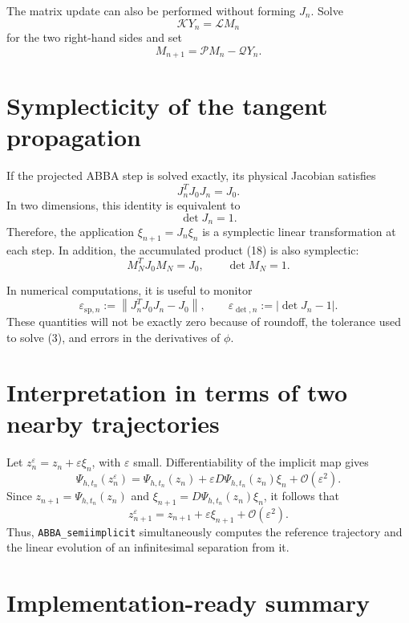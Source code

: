\documentclass[11pt,a4paper]{article}
\newcommand{\norm}[1]{\left\lVert #1\right\rVert}
\begin{document}
The matrix update can also be performed without forming $J_n$. Solve
\[
 \mathcal K Y_n=\mathcal L M_n
\]
for the two right-hand sides and set
\[
 \boxed{
 M_{n+1}=\mathcal P M_n-\mathcal QY_n.
 }
 \tag{19}
\]

\section{Symplecticity of the tangent propagation}

If the projected ABBA step is solved exactly, its physical Jacobian satisfies
\[
 J_n^TJ_0J_n=J_0.
\]
In two dimensions, this identity is equivalent to
\[
 \det J_n=1.
\]
Therefore, the application $\xi_{n+1}=J_n\xi_n$ is a symplectic linear transformation at
each step. In addition, the accumulated product (18) is also symplectic:
\[
 M_N^TJ_0M_N=J_0,
 \qquad
 \det M_N=1.
\]

In numerical computations, it is useful to monitor
\[
 \varepsilon_{\mathrm{sp},n}
 :=\norm{J_n^TJ_0J_n-J_0},
 \qquad
 \varepsilon_{\det,n}:=\lvert\det J_n-1\rvert.
\]
These quantities will not be exactly zero because of roundoff, the tolerance used to
solve (3), and errors in the derivatives of $\phi$.

\section{Interpretation in terms of two nearby trajectories}

Let $z_n^\varepsilon=z_n+\varepsilon\xi_n$, with $\varepsilon$ small. Differentiability of
the implicit map gives
\[
 \Psi_{h,t_n}(z_n^\varepsilon)
 =\Psi_{h,t_n}(z_n)
 +\varepsilon D\Psi_{h,t_n}(z_n)\xi_n
 +\mathcal O(\varepsilon^2).
\]
Since $z_{n+1}=\Psi_{h,t_n}(z_n)$ and
$\xi_{n+1}=D\Psi_{h,t_n}(z_n)\xi_n$, it follows that
\[
 z_{n+1}^\varepsilon
 =z_{n+1}+\varepsilon\xi_{n+1}+\mathcal O(\varepsilon^2).
\]
Thus, \texttt{ABBA\_semiimplicit} simultaneously computes the reference trajectory and
the linear evolution of an infinitesimal separation from it.

\section{Implementation-ready summary}
\end{document}
